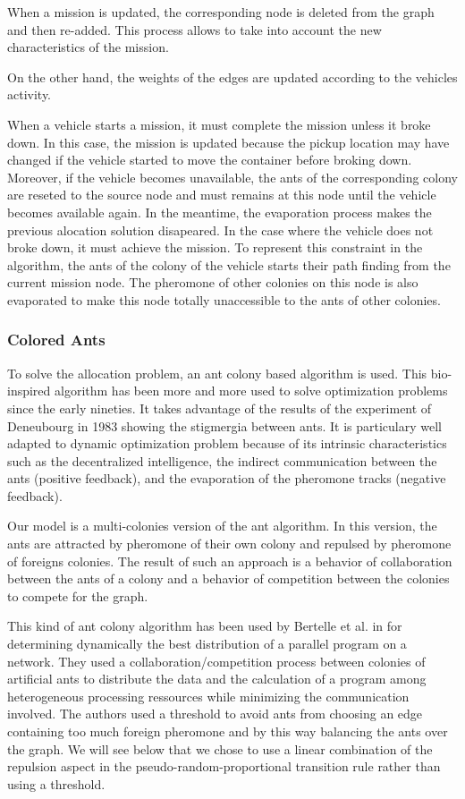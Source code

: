\documentclass[a4paper,10pt]{article}
\begin{document}
When a mission is updated, the corresponding node is deleted from the graph and then re-added. This process allows to take into account the new characteristics of the mission.

On the other hand, the weights of the edges are updated according to the vehicles activity.

When a vehicle starts a mission, it must complete the mission unless it broke down. In this case, the mission is updated because the pickup location may have changed if the vehicle started to move the container before broking down. Moreover, if the vehicle becomes unavailable, the ants of the corresponding colony are reseted to the source node and must remains at this node until the vehicle becomes available again. In the meantime, the evaporation process makes the previous alocation solution disapeared.
In the case where the vehicle does not broke down, it must achieve the mission. To represent this constraint in the algorithm, the ants of the colony of the vehicle starts their path finding from the current mission node. The pheromone of other colonies on this node is also evaporated to make this node totally unaccessible to the ants of other colonies.

\subsubsection{Colored Ants}
To solve the allocation problem, an ant colony based algorithm is used. This bio-inspired algorithm has been more and more used to solve optimization problems since the early nineties\cite{Dorigo2006}. It takes advantage of the results of the experiment of Deneubourg in 1983 \cite{Deneubourg1983} showing the stigmergia between ants. It is particulary well adapted to dynamic optimization problem because of its intrinsic characteristics such as the decentralized intelligence, the indirect communication between the ants (positive feedback), and the evaporation of the pheromone tracks (negative feedback).

Our model is a multi-colonies version of the ant algorithm. In this version, the ants are attracted by pheromone of their own colony and repulsed by pheromone of foreigns colonies. The result of such an approach is a behavior of collaboration between the ants of a colony and a behavior of competition between the colonies to compete for the graph.

This kind of ant colony algorithm has been used by Bertelle et al. in \cite{Bertelle2006,Bertelle2007} for determining dynamically the best distribution of a parallel program on a network. They used a collaboration/competition process between colonies of artificial ants to distribute the data and the calculation of a program among heterogeneous processing ressources while minimizing the communication involved. The authors used a threshold to avoid ants from choosing an edge containing too much foreign pheromone and by this way balancing the ants over the graph. We will see below that we chose to use a linear combination of the repulsion aspect in the pseudo-random-proportional transition rule rather than using a threshold.
\end{document}
